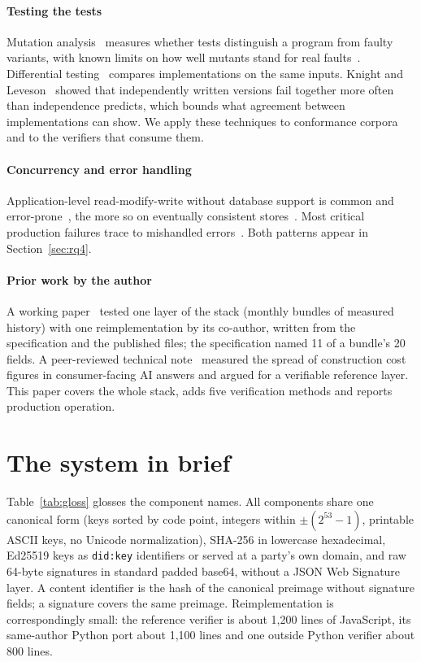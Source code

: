 \documentclass[preprint,12pt,authoryear]{elsarticle}
\newcommand{\code}[1]{\texttt{#1}}
\begin{document}
\paragraph{Testing the tests} Mutation analysis~\citep{demillo1978,jia2011,papadakis2019} measures whether tests distinguish a program from faulty variants, with known limits on how well mutants stand for real faults~\citep{just2014}. Differential testing~\citep{mckeeman1998,yang2011} compares implementations on the same inputs. Knight and Leveson~\citep{knight1986} showed that independently written versions fail together more often than independence predicts, which bounds what agreement between implementations can show. We apply these techniques to conformance corpora and to the verifiers that consume them.

\paragraph{Concurrency and error handling} Application-level read-modify-write without database support is common and error-prone~\citep{bailis2015}, the more so on eventually consistent stores~\citep{vogels2009,cfkv}. Most critical production failures trace to mishandled errors~\citep{yuan2014}. Both patterns appear in Section~\ref{sec:rq4}.

\paragraph{Prior work by the author} A working paper~\citep{ssrn7419998} tested one layer of the stack (monthly bundles of measured history) with one reimplementation by its co-author, written from the specification and the published files; the specification named 11 of a bundle's 20 fields. A peer-reviewed technical note~\citep{oga2026iic} measured the spread of construction cost figures in consumer-facing AI answers and argued for a verifiable reference layer. This paper covers the whole stack, adds five verification methods and reports production operation.

\section{The system in brief}\label{sec:system}

Table~\ref{tab:gloss} glosses the component names. All components share one canonical form (keys sorted by code point, integers within $\pm(2^{53}-1)$, printable ASCII keys, no Unicode normalization), SHA-256 in lowercase hexadecimal, Ed25519 keys as \code{did:key} identifiers or served at a party's own domain, and raw 64-byte signatures in standard padded base64, without a JSON Web Signature layer. A content identifier is the hash of the canonical preimage without signature fields; a signature covers the same preimage. Reimplementation is correspondingly small: the reference verifier is about 1,200 lines of JavaScript, its same-author Python port about 1,100 lines and one outside Python verifier about 800 lines.
\end{document}
